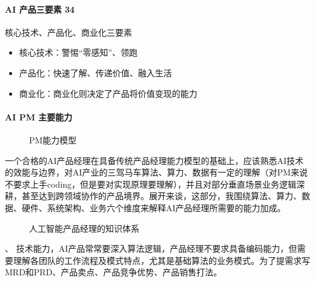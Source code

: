 \documentclass[letterpaper,11pt,english]{sphinxmanual}
\begin{document}
\paragraph{AI 产品三要素 34\sphinxfootnotemark[230]}
\label{\detokenize{chapter_introduction/AI_PM:ai-34}}%
\begin{footnotetext}[230]\sphinxAtStartFootnote
{}
%
\end{footnotetext}\ignorespaces 
核心技术、产品化、商业化三要素
\begin{itemize}
\item {} 
核心技术：警惕“零感知”、领跑

\item {} 
产品化：快速了解、传递价值、融入生活

\item {} 
商业化：商业化则决定了产品将价值变现的能力

\end{itemize}


\paragraph{AI PM 主要能力}
\label{\detokenize{chapter_introduction/AI_PM:ai-pm}}
\begin{figure}[H]
\centering
\capstart

\noindent{}
\caption{PM能力模型}\label{\detokenize{chapter_introduction/AI_PM:id51}}\end{figure}

一个合格的AI产品经理在具备传统产品经理能力模型的基础上，应该熟悉AI技术的效能与边界，对AI产业的三驾马车算法、算力、数据有一定的理解（对PM来说不要求上手coding，但是要对实现原理要理解），并且对部分垂直场景业务逻辑深耕，甚至达到跨领域协作的产品境界。展开来谈，这部分，我围绕算法、算力、数据、硬件、系统架构、业务六个维度来解释AI产品经理所需要的能力加成。%
\begin{footnote}[231]\sphinxAtStartFootnote
{}
%
\end{footnote}

\begin{figure}[H]
\centering
\capstart

\noindent{}
\caption{人工智能产品经理的知识体系\sphinxfootnotemark[232]}\label{\detokenize{chapter_introduction/AI_PM:id52}}\end{figure}
%
\begin{footnotetext}[232]\sphinxAtStartFootnote
{}
%
\end{footnotetext}、
技术能力，AI产品常常要深入算法逻辑，产品经理不要求具备编码能力，但需要理解各团队的工作流程及模式特点，尤其是基础算法的业务模式。为了提需求写MRD和PRD、产品卖点、产品竞争优势、产品销售打法。
\end{document}

